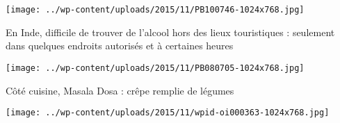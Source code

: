  

 

\begin{center} \texttt{[image: ../wp-content/uploads/2015/11/PB100746-1024x768.jpg]} \end{center}

 

 En Inde, difficile de trouver de l'alcool hors des lieux touristiques : seulement dans quelques endroits autorisés et à certaines heures 

 

\begin{center} \texttt{[image: ../wp-content/uploads/2015/11/PB080705-1024x768.jpg]} \end{center}

 

 Côté cuisine, Masala Dosa : crêpe remplie de légumes 

 

\begin{center} \texttt{[image: ../wp-content/uploads/2015/11/wpid-oi000363-1024x768.jpg]} \end{center}




 
 
